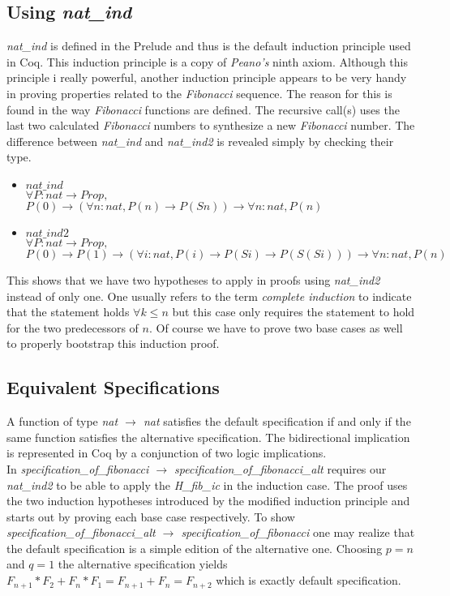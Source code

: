 \documentclass[9pt,a4paper,oneside]{article}
\begin{document}
\subsection{Using \textit{nat\_ind}}
\textit{nat\_ind} is defined in the Prelude and thus is the default induction principle used in Coq. This induction principle is a copy of \textit{Peano’s} ninth axiom. Although this principle i really powerful, another induction principle appears to be very handy in proving properties related to the \textit{Fibonacci} sequence. The reason for this is found in the way \textit{Fibonacci} functions are defined. The recursive call(s) uses the last two calculated \textit{Fibonacci} numbers to synthesize a new \textit{Fibonacci} number.
The difference between \textit{nat\_ind} and \textit{nat\_ind2} is revealed simply by checking their type.
\begin{itemize}
\item $nat\_ind$\\
  $\forall P: nat \rightarrow Prop,$\\
  $P(0) \rightarrow  (\forall n : nat, P(n) \rightarrow P (S n)) \rightarrow \forall n : nat, P(n)$
\item $nat\_ind2$\\
  $\forall P: nat \rightarrow Prop,$\\
  $P(0)\rightarrow P(1) \rightarrow (\forall i : nat, P(i) \rightarrow P (S i)\rightarrow P(S(S i))) \rightarrow \forall n : nat, P(n)$
\end{itemize}
 
This shows that we have two hypotheses to apply in proofs using \textit{nat\_ind2} instead of only one. One usually refers to the term \textit{complete induction} to indicate that the statement holds $\forall k\leq n$ but this case only requires the statement to hold for the two predecessors of $n$. Of course we have to prove two base cases as well to properly bootstrap this induction proof.  

\subsection{Equivalent Specifications}
A function of type \textit{nat $\rightarrow$ nat} satisfies the default specification if and only if the same function satisfies the alternative specification. The bidirectional implication is represented in Coq by a conjunction of two logic implications. \\
In \textit{specification\_of\_fibonacci $\rightarrow$ specification\_of\_fibonacci\_alt} requires our \textit{nat\_ind2} to be able to apply the \textit{H\_fib\_ic} in the induction case. The proof uses the two induction hypotheses introduced by the modified induction principle and starts out by proving each base case respectively. 
To show \textit{specification\_of\_fibonacci\_alt $\rightarrow$ specification\_of\_fibonacci} one may realize that the default specification is a simple edition of the alternative one. Choosing $p=n$ and $q=1$ the alternative specification yields $F_{n+1}*F_2+F_n*F_1=F_{n+1}+F_n=F_{n+2}$ which is exactly default specification. 
\end{document}
